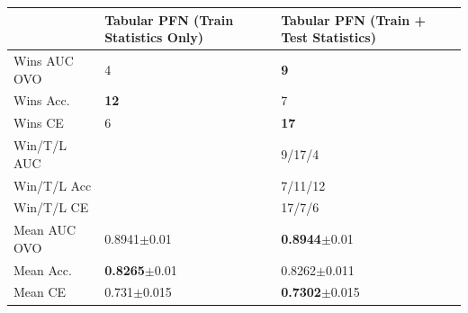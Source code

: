 \begin{tabular}{lll}
\toprule
{} & Tabular PFN (Train Statistics Only) & Tabular PFN (Train + Test Statistics) \\
\midrule
Wins AUC OVO      &                           4 &                         \textbf{9} \\
Wins Acc.         &                 \textbf{12} &                                  7 \\
Wins CE           &                           6 &                        \textbf{17} \\
Win/T/L AUC &                        &                             9/17/4 \\
Win/T/L Acc &                       &                            7/11/12 \\
Win/T/L CE  &                       &                             17/7/6 \\
Mean AUC OVO      &           0.8941$\pm$0.01 &           \textbf{0.8944}$\pm$0.01 \\
Mean Acc.         &    \textbf{0.8265}$\pm$0.01 &                   0.8262$\pm$0.011 \\
Mean CE           &             0.731$\pm$0.015 &          \textbf{0.7302}$\pm$0.015 \\
\bottomrule
\end{tabular}
